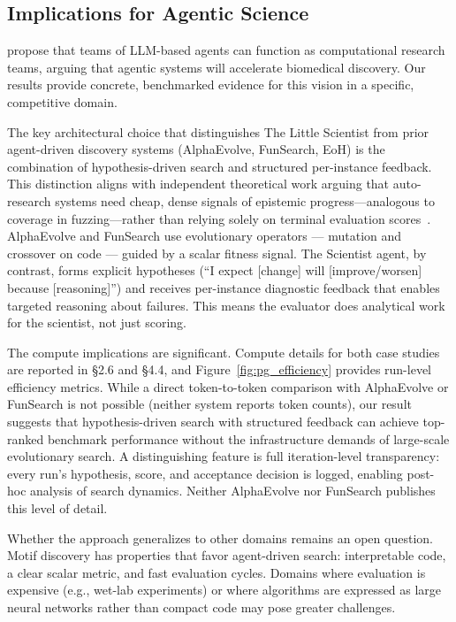 \documentclass[11pt,a4paper]{article}
\begin{document}
\subsection{Implications for Agentic Science}

\citet{li2026agentic} propose that teams of LLM-based agents can function as computational research teams, arguing that agentic systems will accelerate biomedical discovery. Our results provide concrete, benchmarked evidence for this vision in a specific, competitive domain.

The key architectural choice that distinguishes The Little Scientist from prior agent-driven discovery systems (AlphaEvolve, FunSearch, EoH) is the combination of hypothesis-driven search and structured per-instance feedback. This distinction aligns with independent theoretical work arguing that auto-research systems need cheap, dense signals of epistemic progress---analogous to coverage in fuzzing---rather than relying solely on terminal evaluation scores~\citep{he2026agentic}. AlphaEvolve and FunSearch use evolutionary operators --- mutation and crossover on code --- guided by a scalar fitness signal. The Scientist agent, by contrast, forms explicit hypotheses (``I expect [change] will [improve/worsen] because [reasoning]'') and receives per-instance diagnostic feedback that enables targeted reasoning about failures. This means the evaluator does analytical work for the scientist, not just scoring.

The compute implications are significant. Compute details for both case studies are reported in \S2.6 and \S4.4, and Figure~\ref{fig:pg_efficiency} provides run-level efficiency metrics. While a direct token-to-token comparison with AlphaEvolve or FunSearch is not possible (neither system reports token counts), our result suggests that hypothesis-driven search with structured feedback can achieve top-ranked benchmark performance without the infrastructure demands of large-scale evolutionary search. A distinguishing feature is full iteration-level transparency: every run's hypothesis, score, and acceptance decision is logged, enabling post-hoc analysis of search dynamics. Neither AlphaEvolve nor FunSearch publishes this level of detail.

Whether the approach generalizes to other domains remains an open question. Motif discovery has properties that favor agent-driven search: interpretable code, a clear scalar metric, and fast evaluation cycles. Domains where evaluation is expensive (e.g., wet-lab experiments) or where algorithms are expressed as large neural networks rather than compact code may pose greater challenges.
\end{document}
